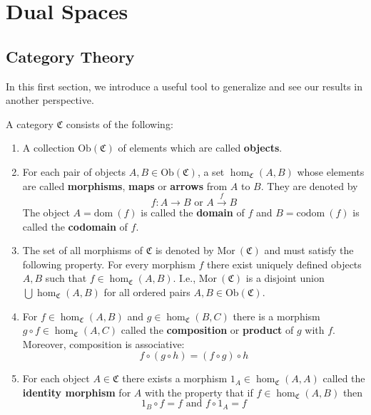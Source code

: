 \chapter{Dual Spaces}

\section{Category Theory}

In this first section, we introduce a useful tool to generalize and see our results in another perspective.

\begin{definition}[Category]
	A category $\mathfrak{C}$ consists of the following:
	\begin{enumerate}
		\item A collection $\text{Ob}(\mathfrak{C})$ of elements which are called \textbf{objects}.
		\item For each pair of objects $A, B \in \text{Ob}(\mathfrak{C})$, a set $\hom_{\mathfrak{C}}(A,B)$ whose elements are called \textbf{morphisms}, \textbf{maps} or \textbf{arrows} from $A$ to $B$. They are denoted by \[ f : A \longrightarrow B \text{ or } A \overset{f}{\longrightarrow} B \] The object $A = \text{dom}~(f)$ is called the \textbf{domain} of $f$ and $B = \text{codom}~(f)$ is called the \textbf{codomain} of $f$.
		\item The set of all morphisms of $\mathfrak{C}$ is denoted by $\text{Mor}~(\mathfrak{C})$ and must satisfy the following property. For every morphism $f$ there exist uniquely defined objects $A, B$ such that $f \in \hom_\mathfrak{C} (A,B)$. I.e., $\text{Mor}~(\mathfrak{C})$ is a disjoint union $\bigcup \hom_\mathfrak{C} (A,B)$ for all ordered pairs $A, B \in \text{Ob} (\mathfrak{C})$.
		\item For $f \in \hom_\mathfrak{C} (A,B)$ and $g \in \hom_\mathfrak{C} (B,C)$ there is a morphism $g \circ f \in \hom_\mathfrak{C} (A,C)$ called the \textbf{composition} or \textbf{product} of $g$ with $f$. Moreover, composition is associative: \[ f \circ (g \circ h) = (f \circ g) \circ h \]
		\item For each object $A \in \mathfrak{C}$ there exists a morphism $1_A \in \hom_\mathfrak{C} (A,A)$ called the \textbf{identity morphism} for $A$ with the property that if $f \in \hom_\mathfrak{C} (A,B)$ then \[ 1_B \circ f = f \text{ and } f \circ 1_A = f \]
	\end{enumerate}
\end{definition}

